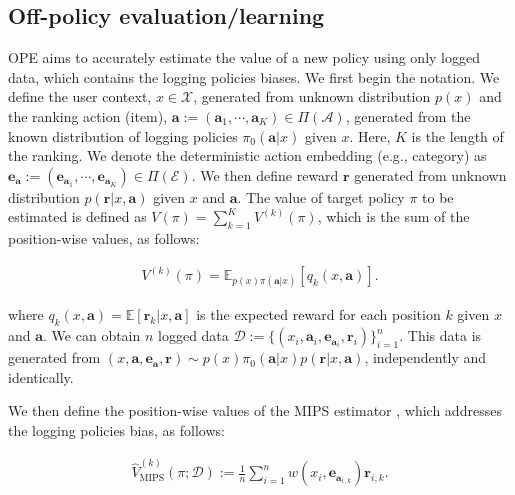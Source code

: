 \subsection{Off-policy evaluation/learning}
OPE aims to accurately estimate the value of a new policy using only logged data, which contains the logging policies biases. We first begin the notation. We define the user context, \( x \in \mathcal{X} \), generated from unknown distribution \( p(x) \) and the ranking action (item), \( \boldsymbol{a} := (\boldsymbol{a}_1,\cdots,\boldsymbol{a}_K) \in \Pi(\mathcal{A}) \), generated from the known distribution of logging policies \( \pi_{0}(\boldsymbol{a}|x) \) given \( x \). Here, \( K \) is the length of the ranking. We denote the deterministic action embedding (e.g., category) as \( \boldsymbol{e}_{\boldsymbol{a}} := (\boldsymbol{e}_{\boldsymbol{a}_1},\cdots,\boldsymbol{e}_{\boldsymbol{a}_K}) \in \Pi(\mathcal{E}) \).
We then define reward \( \boldsymbol{r} \) generated from unknown distribution \( p(\boldsymbol{r}|x,\boldsymbol{a}) \) given \( x \) and \( \boldsymbol{a} \). The value of target policy \( \pi \) to be estimated is defined as \( V(\pi) = \sum_{k=1}^{K} V^{(k)}(\pi) \), which is the sum of the position-wise values, as follows:

\vspace{-5mm}
\begin{align}
    V^{(k)}(\pi) = \mathbb{E}_{p(x)\pi(\boldsymbol{a}|x)}[q_{k}(x, \boldsymbol{a})].
\end{align}
\vspace{-5mm}

where \( q_{k}(x, \boldsymbol{a}) = \mathbb{E}[\boldsymbol{r}_k|x,\boldsymbol{a}] \) is the expected reward for each position \( k \) given \( x \) and \( \boldsymbol{a} \). We can obtain \( n \) logged data \( \mathcal{D} := \{ (x_i, \boldsymbol{a}_i, \boldsymbol{e}_{\boldsymbol{a}_i}, \boldsymbol{r}_i) \}_{i=1}^{n} \). This data is generated from \( (x,\boldsymbol{a}, \boldsymbol{e}_{\boldsymbol{a}}, \boldsymbol{r}) \sim p(x)\pi_{0}(\boldsymbol{a}|x)p(\boldsymbol{r}|x,\boldsymbol{a}) \), independently and identically.

We then define the position-wise values of the MIPS estimator \cite{saito2022off}, which addresses the logging policies bias, as follows:

\vspace{-6mm}
\begin{align}
    \hat{V}^{(k)}_{\text{MIPS}}(\pi;\mathcal{D}) := \frac{1}{n}\sum_{i=1}^{n} w(x_i, \boldsymbol{e}_{\boldsymbol{a}_{i,k}}) \boldsymbol{r}_{i,k}.
\end{align}
\vspace{-4mm}

